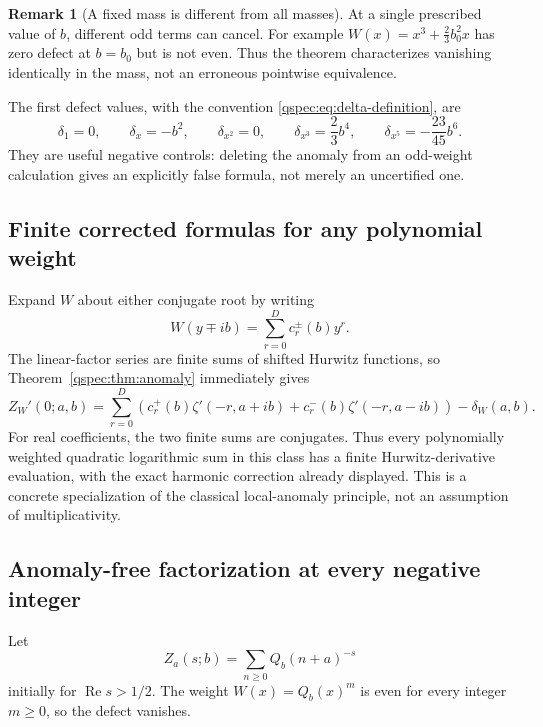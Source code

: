 \documentclass[11pt,letterpaper]{article}
\numberwithin{equation}{section}
\theoremstyle{definition}
\newtheorem{remark}[theorem]{Remark}
\newcommand{\Rea}{\operatorname{Re}}
\begin{document}
\begin{remark}[A fixed mass is different from all masses]
At a single prescribed value of $b$, different odd terms can cancel.
For example $W(x)=x^3+\tfrac23b_0^2x$ has zero defect at $b=b_0$
but is not even. Thus the theorem characterizes vanishing identically
in the mass, not an erroneous pointwise equivalence.
\end{remark}

The first defect values, with the convention
\eqref{qspec:eq:delta-definition}, are
\begin{equation}\label{qspec:eq:anomaly-examples}
\delta_1=0,\qquad \delta_x=-b^2,\qquad
\delta_{x^2}=0,\qquad \delta_{x^3}=\frac23b^4,\qquad
\delta_{x^5}=-\frac{23}{45}b^6.
\end{equation}
They are useful negative controls: deleting the anomaly from an odd-weight
calculation gives an explicitly false formula, not merely an uncertified
one.

\subsection{Finite corrected formulas for any polynomial weight}
Expand $W$ about either conjugate root by writing
\begin{equation}\label{qspec:eq:shifted-weight-coeffs}
W(y\mp ib)=\sum_{r=0}^D c_r^\pm(b)y^r.
\end{equation}
The linear-factor series are finite sums of shifted Hurwitz functions,
so Theorem~\ref{qspec:thm:anomaly} immediately gives
\begin{equation}\label{qspec:eq:general-weighted-hurwitz}
Z_W'(0;a,b)=
\sum_{r=0}^D\left(c_r^+(b)\zeta'(-r,a+ib)
+c_r^-(b)\zeta'(-r,a-ib)\right)-\delta_W(a,b).
\end{equation}
For real coefficients, the two finite sums are conjugates. Thus every
polynomially weighted quadratic logarithmic sum in this class has a
finite Hurwitz-derivative evaluation, with the exact harmonic correction
already displayed. This is a concrete specialization of the classical
local-anomaly principle, not an assumption of multiplicativity.

\subsection{Anomaly-free factorization at every negative integer}
Let
\begin{equation}\label{qspec:eq:one-sided}
Z_a(s;b)=\sum_{n\ge0}Q_b(n+a)^{-s}
\end{equation}
initially for $\Rea s>1/2$. The weight $W(x)=Q_b(x)^m$ is even for every
integer $m\ge0$, so the defect vanishes.
\end{document}
